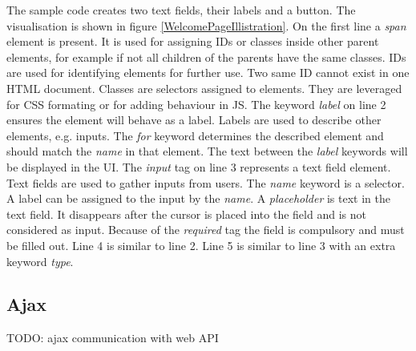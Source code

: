The sample code creates two text fields, their labels and a button. The visualisation is shown in figure \ref{WelcomePageIllistration}. On the first line a \textit{span} element is present. It is used for assigning IDs or classes inside other parent elements, for example if not all children of the parents have the same classes. IDs are used for identifying elements for further use. Two same ID cannot exist in one HTML document. Classes are selectors assigned to elements. They are leveraged for CSS formating or for adding behaviour in JS. The keyword \textit{label} on line 2 ensures the element will behave as a label. Labels are used to describe other elements, e.g. inputs. The \textit{for} keyword determines the described element and should match the \textit{name} in that element. The text between the \textit{label} keywords will be displayed in the UI. The \textit{input} tag on line 3 represents a text field element. Text fields are used to gather inputs from users. The \textit{name} keyword is a selector. A label can be assigned to the input by the \textit{name}. A \textit{placeholder} is text in the text field. It disappears after the cursor is placed into the field and is not considered as input. Because of the \textit{required} tag the field is compulsory and must be filled out. Line 4 is similar to line 2. Line 5 is similar to line 3 with an extra keyword \textit{type}. 

\subsection{Ajax}
TODO: ajax communication with web API


